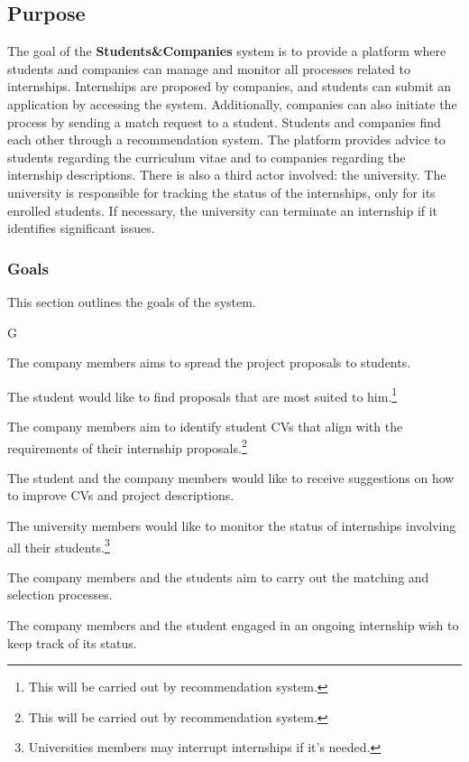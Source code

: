 \subsection{Purpose}
The goal of the \textbf{Students\&Companies} system is to provide a platform 
where students and companies can manage and monitor all processes related to 
internships. Internships are proposed by companies, and students can submit an 
application by accessing the system. Additionally, companies can also initiate 
the process by sending a match request to a student. Students and companies find each other through a recommendation system.
The platform provides advice to students regarding the curriculum vitae and to companies regarding the
internship descriptions. There is also a third actor involved: the university. 
The university is responsible for tracking the status of the internships, only for its enrolled students. 
If necessary, the university can terminate an internship if it identifies significant issues.

\subsubsection{Goals}
This section outlines the goals of the system.
\begin{listInSquareBrackets}{G}
    \item The company members aims to spread the project proposals to students.
    \item The student would like to find proposals that are most suited to him.\footnote{This will be carried out by recommendation system.}
    \item The company members aim to identify student CVs that align with the requirements of their internship proposals.\footnote{This will be carried out by recommendation system.}
    \item The student and the company members would like to receive suggestions on how to improve CVs and project descriptions.
    \item The university members would like to monitor the status of internships involving all their students.\footnote{Universities members may interrupt internships if it's needed.}
    \item The company members and the students aim to carry out the matching and selection processes.
    \item The company members and the student engaged in an ongoing internship wish to keep track of its status.
\end{listInSquareBrackets}

